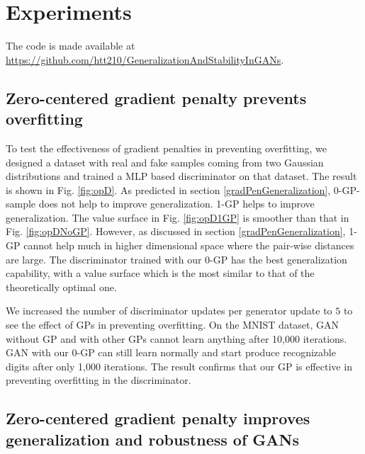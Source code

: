 \documentclass{article} %
\begin{document}
\section{Experiments}
The code is made available at \url{https://github.com/htt210/GeneralizationAndStabilityInGANs}.
\subsection{Zero-centered gradient penalty prevents overfitting}
To test the effectiveness of gradient penalties in preventing overfitting, we designed a dataset with real and fake samples coming from two Gaussian distributions and trained a MLP based discriminator on that dataset. The result is shown in Fig. \ref{fig:opD}. As predicted in section \ref{gradPenGeneralization}, 0-GP-sample does not help to improve generalization.
1-GP helps to improve generalization. The value surface in Fig. \ref{fig:opD1GP} is smoother than that in Fig. \ref{fig:opDNoGP}. However, as discussed in section \ref{gradPenGeneralization}, 1-GP cannot help much in higher dimensional space where the pair-wise distances are large. 
The discriminator trained with our 0-GP has the best generalization capability, with a value surface which is the most similar to that of the theoretically optimal one.

We increased the number of discriminator updates per generator update to $5$ to see the effect of GPs in preventing overfitting. On the MNIST dataset, GAN without GP and with other GPs cannot learn anything after 10,000 iterations. GAN with our 0-GP can still learn normally and start produce recognizable digits after only 1,000 iterations. 
The result confirms that our GP is effective in preventing overfitting in the discriminator.

\subsection{Zero-centered gradient penalty improves generalization and robustness of GANs}
\end{document}
